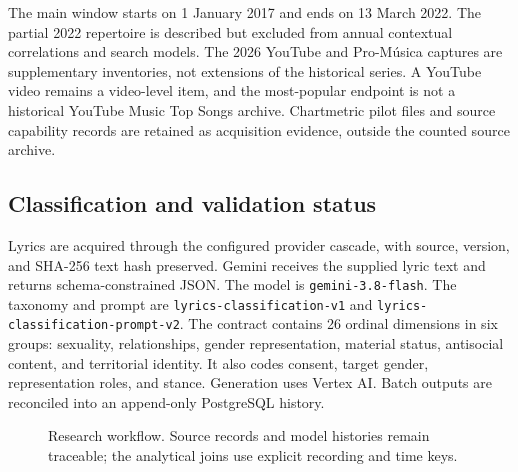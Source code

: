 \documentclass[10pt,a4paper,twocolumn]{article}
\begin{document}
The main window starts on 1 January 2017 and ends on 13 March 2022. The partial 2022 repertoire is described but excluded from annual contextual correlations and search models. The 2026 YouTube and Pro-M\'usica captures are supplementary inventories, not extensions of the historical series. A YouTube video remains a video-level item, and the most-popular endpoint is not a historical YouTube Music Top Songs archive. Chartmetric pilot files and source capability records are retained as acquisition evidence, outside the counted source archive.

\subsection{Classification and validation status}
Lyrics are acquired through the configured provider cascade, with source, version, and SHA-256 text hash preserved. Gemini receives the supplied lyric text and returns schema-constrained JSON. The model is \texttt{gemini-3.8-flash}. The taxonomy and prompt are \texttt{lyrics-classification-v1} and \texttt{lyrics-classification-prompt-v2}. The contract contains 26 ordinal dimensions in six groups: sexuality, relationships, gender representation, material status, antisocial content, and territorial identity. It also codes consent, target gender, representation roles, and stance. Generation uses Vertex AI. Batch outputs are reconciled into an append-only PostgreSQL history.

\begin{figure}[t]
\centering
{}
\caption{Research workflow. Source records and model histories remain traceable; the analytical joins use explicit recording and time keys.}
\label{fig:workflow}
\end{figure}
\end{document}
